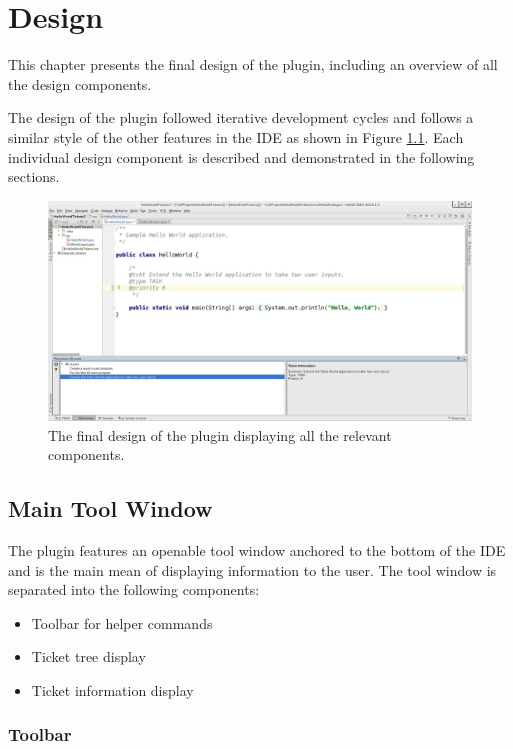 \documentclass{4thYearProject}
\begin{document}
\chapter{Design}

This chapter presents the final design of the plugin, including an overview of all the design components. 

The design of the plugin followed iterative development cycles and follows a similar style of the other features in the IDE as shown in Figure \ref{fig:fulldesign}. Each individual design component is described and demonstrated in the following sections.

\begin{figure}[H]
\includegraphics[scale=0.35]{Full_design_white}
\centering
\caption{The final design of the plugin displaying all the relevant components.}
\label{fig:fulldesign}
\end{figure}

\section{Main Tool Window}

The plugin features an openable tool window anchored to the bottom of the IDE and is the main mean of displaying information to the user. The tool window is separated into the following components: 

\begin{itemize}
\item Toolbar for helper commands
\item Ticket tree display
\item Ticket information display
\end{itemize}

\subsection{Toolbar}\label{sec:toolbar}
\end{document}
